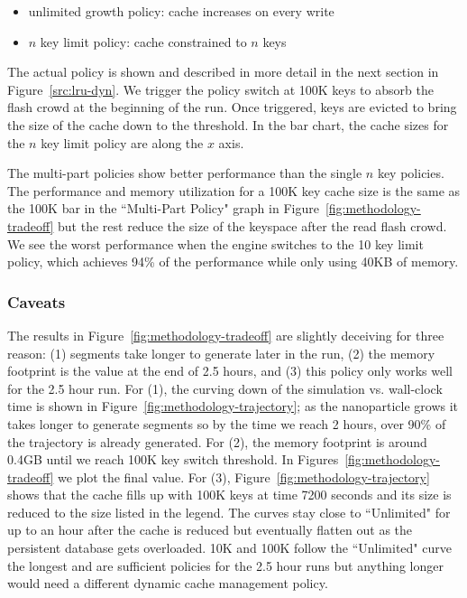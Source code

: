 \begin{itemize}
  \item unlimited growth policy: cache increases on every write
  \item \(n\) key limit policy: cache constrained to \(n\) keys
\end{itemize}

The actual policy is shown and described in more detail in the next section in
Figure~\ref{src:lru-dyn}.  We trigger the policy switch at 100K keys to absorb
the flash crowd at the beginning of the run. Once triggered, keys are evicted
to bring the size of the cache down to the threshold.  In the bar chart, the
cache sizes for the \(n\) key limit policy are along the \(x\) axis.

The multi-part policies show better performance than the single \(n\) key
policies. The performance and memory utilization for a 100K key cache size is
the same as the 100K bar in the ``Multi-Part Policy" graph in  Figure~\ref{fig:methodology-tradeoff} but
the rest reduce the size of the keyspace after the read flash crowd.  We see
the worst performance when the engine switches to the 10 key limit policy,
which achieves 94\% of the performance while only using 40KB of memory. 

\subsubsection*{Caveats}

The results in Figure~\ref{fig:methodology-tradeoff} are slightly deceiving for
three reason: (1) segments take longer to generate later in the run, (2) the
memory footprint is the value at the end of 2.5 hours, and (3) this policy only
works well for the 2.5 hour run.  For (1), the curving down of the simulation
vs. wall-clock time is shown in Figure~\ref{fig:methodology-trajectory}; as the
nanoparticle grows it takes longer to generate segments so by the time we reach
2 hours, over 90\% of the trajectory is already generated.  For (2), the memory
footprint is around 0.4GB until we reach 100K key switch threshold. In
Figures~\ref{fig:methodology-tradeoff} we plot the final value. For (3),
Figure~\ref{fig:methodology-trajectory} shows that the cache fills up with 100K
keys at time 7200 seconds and its size is reduced to the size listed in the
legend.  The curves stay close to ``Unlimited" for up to an hour after the
cache is reduced but eventually flatten out as the persistent database gets
overloaded. 10K and 100K follow the ``Unlimited" curve the longest and are
sufficient policies for the 2.5 hour runs but anything longer would need a
different dynamic cache management policy.


